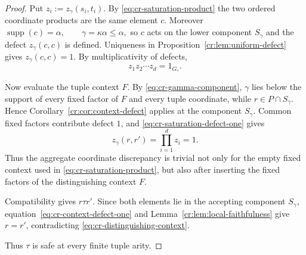 \documentclass[10pt,a4paper]{amsart}
\begin{document}
\begin{proof}
Put \(z_i:=z_\gamma(s_i,t_i).\)  By \eqref{eq:cr-saturation-product} the two ordered
coordinate products are the same element $c$.  Moreover
\(\operatorname{supp}(c)=\alpha, \qquad \gamma=\kappa\alpha\le\alpha,\)
so $c$ acts on the lower component $S_\gamma$ and the defect
$z_\gamma(c,c)$ is defined.  Uniqueness in
Proposition~\ref{cr:lem:uniform-defect} gives $z_\gamma(c,c)=1$.
By multiplicativity of defects,
\begin{equation}
z_1z_2\cdots z_d
=
1_{G_\gamma}.
\label{eq:cr-saturation-defect-one}
\end{equation}

Now evaluate the tuple context $F$.  By \eqref{eq:cr-gamma-component}, $\gamma$ lies below
the support of every fixed factor of $F$ and every tuple coordinate, while
$r\in P\cap S_\gamma$.  Hence
Corollary~\ref{cr:cor:context-defect} applies at the component $S_\gamma$.
Common fixed factors contribute defect $1$, and \eqref{eq:cr-saturation-defect-one} gives
\begin{equation}
z_\gamma(r,r')
=
\prod_{i=1}^d z_i
=
1.
\label{eq:cr-context-defect-one}
\end{equation}
Thus the aggregate coordinate discrepancy is trivial not only for the empty
fixed context used in \eqref{eq:cr-saturation-product}, but also after inserting the fixed factors
of the distinguishing context $F$.

Compatibility gives \(r\tau r'.\)  Since both elements lie in the accepting
component $S_\gamma$, equation~\eqref{eq:cr-context-defect-one} and
Lemma~\ref{cr:lem:local-faithfulness} give $r=r'$, contradicting
\eqref{eq:cr-distinguishing-context}.

Thus $\tau$ is safe at every finite tuple arity. \end{proof}
\end{document}

